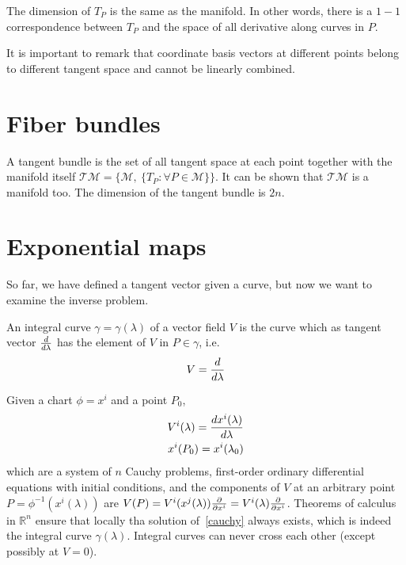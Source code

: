     The dimension of $T_P$ is the same as the manifold. In other words, there is a $1-1$ correspondence between $T_P$ and the space of all derivative along curves in $P$. 

    It is important to remark that coordinate basis vectors at different points belong to different tangent space and cannot be linearly combined.

\section{Fiber bundles}

    A tangent bundle is the set of all tangent space at each point together with the manifold itself $\mathcal T \mathcal M = \{\mathcal M, ~\{T_P \colon \forall P \in \mathcal M \}\}$. It can be shown that $\mathcal T \mathcal M$ is a manifold too. The dimension of the tangent bundle is $2n$. 

\section{Exponential maps}

    So far, we have defined a tangent vector given a curve, but now we want to examine the inverse problem. 
    
    \begin{definition}
        An integral curve $\gamma = \gamma(\lambda)$ of a vector field $V$ is the curve which as tangent vector $\frac{d}{d\lambda}$ has the element of $V$ in $P \in \gamma$, i.e. 
        \begin{equation*}
            V = \frac{d}{d\lambda}
        \end{equation*}
    \end{definition}

    Given a chart $\phi = x^i$ and a point $P_0$,
    \begin{equation} \label{cauchy}
        \begin{split}
            V^i(\lambda) = \frac{dx^i(\lambda)}{d\lambda} \\
            x^i(P_0) = x^i(\lambda_0)
        \end{split}
    \end{equation}
    which are a system of $n$ Cauchy problems, first-order ordinary differential equations with initial conditions, and the components of $V$ at an arbitrary point $P = \phi^{-1}(x^i(\lambda))$ are $V(P) = V^i(x^j(\lambda)) \frac{\partial}{\partial x^i} = V^i(\lambda) \frac{\partial}{\partial x^i}$. Theorems of calculus in $\mathbb R^n$ ensure that locally tha solution of~\eqref{cauchy} always exists, which is indeed the integral curve $\gamma(\lambda)$. Integral curves can never cross each other (except possibly at $V = 0$). 

